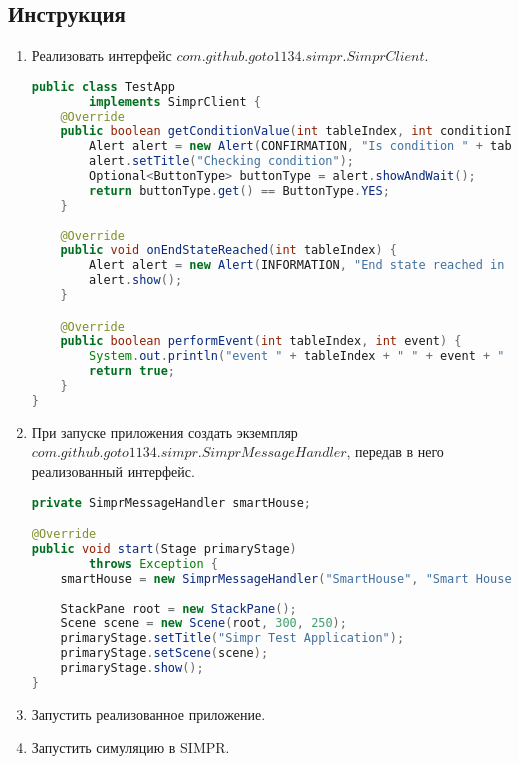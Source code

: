 	 	\subsection{Инструкция}
	 		\begin{enumerate}
	 			\item Реализовать интерфейс $ com.github.goto1134.simpr.SimprClient $.
	 				\begin{ListingEnv}[!h]%
	 					\caption{Пример реализации интерфейса SimprClient}
	 					\label{list:client}
	 					\begin{lstlisting}[language={Java}]
public class TestApp
		implements SimprClient {
	@Override
	public boolean getConditionValue(int tableIndex, int conditionIndex) {
		Alert alert = new Alert(CONFIRMATION, "Is condition " + tableIndex + " " + conditionIndex + " true?", ButtonType.YES, ButtonType.NO);
		alert.setTitle("Checking condition");
		Optional<ButtonType> buttonType = alert.showAndWait();
		return buttonType.get() == ButtonType.YES;
	}
	
	@Override
	public void onEndStateReached(int tableIndex) {
		Alert alert = new Alert(INFORMATION, "End state reached in table " + tableIndex);
		alert.show();
	}

	@Override
	public boolean performEvent(int tableIndex, int event) {
		System.out.println("event " + tableIndex + " " + event + " occured");
		return true;
	}
}
	 					\end{lstlisting}
	 				\end{ListingEnv}%
	 			\item При запуске приложения создать экземпляр 
	 			$ com.github.goto1134.simpr.SimprMessageHandler $, передав в него реализованный интерфейс.
	 			\begin{ListingEnv}[!h]%
	 				\caption{Пример кода, запускающего приложение}
	 				\label{list:handler}
	 				\begin{lstlisting}[language={Java}]
private SimprMessageHandler smartHouse;

@Override
public void start(Stage primaryStage)
		throws Exception {
	smartHouse = new SimprMessageHandler("SmartHouse", "Smart House Simulator", this);
	
	StackPane root = new StackPane();
	Scene scene = new Scene(root, 300, 250);
	primaryStage.setTitle("Simpr Test Application");
	primaryStage.setScene(scene);
	primaryStage.show();
}
	 				\end{lstlisting}
	 			\end{ListingEnv}%
 				\FloatBarrier
 				\item Запустить реализованное приложение.
 				\item Запустить симуляцию в SIMPR.	
 			\end{enumerate}
 		
